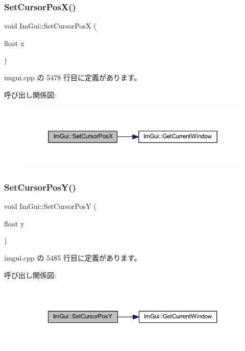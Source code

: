 \subsubsection{\texorpdfstring{Set\+Cursor\+Pos\+X()}{SetCursorPosX()}}
{\footnotesize\ttfamily void Im\+Gui\+::\+Set\+Cursor\+PosX (\begin{DoxyParamCaption}\item[{float}]{x }\end{DoxyParamCaption})}



 imgui.\+cpp の 5478 行目に定義があります。

呼び出し関係図\+:\nopagebreak
\begin{figure}[H]
\begin{center}
\leavevmode
\includegraphics[width=350pt]{namespace_im_gui_a8f56616f8d0b35e6e756c0b7f198ac0f_cgraph}
\end{center}
\end{figure}
\mbox{\label{namespace_im_gui_a0174d351957d5c5677ebc214dd54f499}} 
\subsubsection{\texorpdfstring{Set\+Cursor\+Pos\+Y()}{SetCursorPosY()}}
{\footnotesize\ttfamily void Im\+Gui\+::\+Set\+Cursor\+PosY (\begin{DoxyParamCaption}\item[{float}]{y }\end{DoxyParamCaption})}



 imgui.\+cpp の 5485 行目に定義があります。

呼び出し関係図\+:\nopagebreak
\begin{figure}[H]
\begin{center}
\leavevmode
\includegraphics[width=350pt]{namespace_im_gui_a0174d351957d5c5677ebc214dd54f499_cgraph}
\end{center}
\end{figure}
\mbox{\label{namespace_im_gui_a632bc7e15b8258f95ab0bc9b2efd5537}} 
